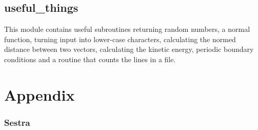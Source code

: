\documentclass[twoside, 11pt, titlepage, captions=nooneline, a4paper, headsepline]{scrbook}%
\newcommand{\9}{\mathrm}
\newcommand{\0}{\,\mathrm}
\begin{document}
\section{useful\_things}
This module contains useful subroutines returning random numbers, a normal function, turning input into lower-case characters, calculating the normed distance between two vectors, calculating the kinetic energy, periodic boundary conditions and a routine that counts the lines in a file.


\chapter{Appendix}

\subsection{Sestra}
\label{Sestra}
\end{document}
